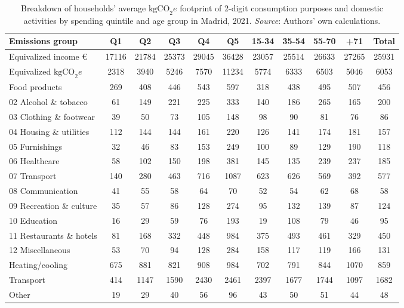 \documentclass[
  10pt,
  twocolumn]{aft}
\begin{document}
\begin{table}[!ht]
\centering
\begin{tabular}[t]{lcccccccccc}
\toprule
Emissions group & Q1 & Q2 & Q3 & Q4 & Q5 & 15-34 & 35-54 & 55-70 & +71 & Total\\
\midrule
Equivalized income \euro{} & 17116 & 21784 & 25373 & 29045 & 36428 & 23057 & 25514 & 26633 & 27265 & 25931\\
Equivalized $\text{kgCO}_2e$ & 2318 & 3940 & 5246 & 7570 & 11234 & 5774 & 6333 & 6503 & 5046 & 6053\\
\addlinespace
01 Food products & 269 & 408 & 446 & 543 & 597 & 318 & 438 & 495 & 507 & 456\\
02 Alcohol \& tobacco & 61 & 149 & 221 & 225 & 333 & 140 & 186 & 265 & 165 & 200\\
03 Clothing \& footwear & 39 & 50 & 73 & 105 & 148 & 98 & 90 & 81 & 76 & 86\\
04 Housing \& utilities & 112 & 144 & 144 & 161 & 220 & 126 & 141 & 174 & 181 & 157\\
05 Furnishings & 32 & 46 & 83 & 153 & 249 & 100 & 89 & 129 & 190 & 118\\
06 Healthcare & 58 & 102 & 150 & 198 & 381 & 145 & 135 & 239 & 237 & 185\\
07 Transport & 140 & 280 & 463 & 716 & 1087 & 623 & 626 & 569 & 392 & 577\\
08 Communication & 41 & 55 & 58 & 64 & 70 & 52 & 54 & 62 & 68 & 58\\
09 Recreation \& culture & 35 & 57 & 86 & 128 & 274 & 95 & 132 & 139 & 87 & 124\\
10 Education & 16 & 29 & 59 & 76 & 193 & 19 & 108 & 79 & 46 & 95\\
11 Restaurants \& hotels & 81 & 168 & 332 & 448 & 984 & 375 & 493 & 461 & 329 & 450\\
12 Miscellaneous & 53 & 70 & 94 & 128 & 284 & 158 & 117 & 119 & 166 & 131\\
\addlinespace
Heating/cooling & 675 & 881 & 821 & 908 & 984 & 702 & 791 & 844 & 1070 & 859\\
Transport & 414 & 1147 & 1590 & 2430 & 2461 & 2397 & 1677 & 1744 & 1097 & 1682\\
Other & 19 & 29 & 40 & 56 & 96 & 43 & 50 & 51 & 44 & 48\\
\bottomrule
\end{tabular}
\caption{Breakdown of households' average $\text{kgCO}_2e$ footprint of 2-digit consumption purposes and domestic activities by spending quintile and age group in Madrid, 2021. \textit{Source}: Authors’ own calculations.\label{tab:emissions-demographic}}
\end{table}
\end{document}

